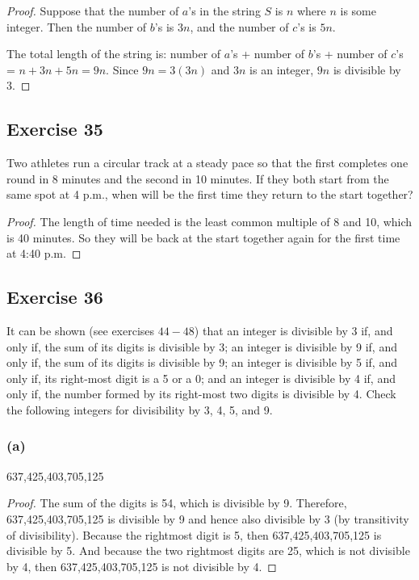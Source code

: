 \documentclass[14pt]{extarticle}
\begin{document}
\begin{proof}
    Suppose that the number of $a$'s in the string $S$ is $n$ where $n$ is some integer. Then the number of $b$'s is $3n$, and the number of $c$'s is $5n$.

    The total length of the string is: number of $a$'s + number of $b$'s + number of $c$'s = $n + 3n + 5n = 9n$. Since $9n = 3(3n)$ and $3n$ is an integer, $9n$ is divisible by 3.
\end{proof}

\subsection{Exercise 35}
Two athletes run a circular track at a steady pace so that the first completes one round in 8 minutes and the second in 10 minutes. If they both start from the same spot at 4 p.m., when will be the first time they return to the start
together?

\begin{proof}
    The length of time needed is the least common multiple of 8 and 10, which is 40 minutes. So they will be back at the start together again for the first time at 4:40 p.m.
\end{proof}

\subsection{Exercise 36}
It can be shown (see exercises $44-48$) that an integer is divisible by 3 if, and only if, the sum of its digits is divisible by 3; an integer is divisible by 9 if, and only if, the sum of its digits is divisible by 9; an integer is divisible by 5 if, and only if, its right-most digit is a 5 or a 0; and an integer is divisible by 4 if, and only if, the number formed by its right-most two digits is divisible by 4. Check the following integers for divisibility by 3, 4, 5, and 9.

\subsubsection{(a)}
637,425,403,705,125

\begin{proof}
    The sum of the digits is 54, which is divisible by 9. Therefore, 637,425,403,705,125 is divisible by 9 and hence also divisible by 3 (by transitivity of divisibility). Because the rightmost digit is 5, then 637,425,403,705,125 is divisible by 5. And because the two rightmost digits are 25, which is not divisible by 4, then 637,425,403,705,125 is not divisible by 4.
\end{proof}
\end{document}
